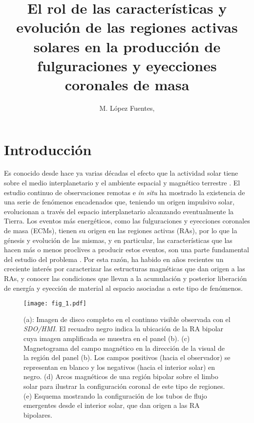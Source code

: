 \documentclass[baaa]{baaa}
\title{El rol de las características y evolución de las regiones
activas solares en la producción de fulguraciones y
eyecciones coronales de masa}
\author{
M. López Fuentes\inst{1},
}
\institute{
Instituto de Astronomía y Física del Espacio, CONICET--UBA, Argentina
}
\begin{document}
\maketitle

\section{Introducción}
\label{S_intro}

Es conocido desde hace ya varias décadas el efecto que la actividad solar tiene sobre el medio interplanetario y el ambiente espacial y magnético terrestre \citep{temmer2021}. El estudio continuo de observaciones remotas e \textit{in situ} ha mostrado la existencia de una serie de fenómenos encadenados que, teniendo un origen impulsivo solar, evolucionan a través del espacio interplanetario alcanzando eventualmente la Tierra. Los eventos más energéticos, como las fulguraciones y eyecciones coronales de masa (ECMs), tienen su origen en las regiones activas (RAs), por lo que la génesis y evolución de las mismas, y en particular, las características que las hacen más o menos proclives a producir estos eventos, son una parte fundamental del estudio del problema \citep{toriumi2019}. Por esta razón, ha habido en años recientes un creciente interés por caracterizar las estructuras magnéticas que dan origen a las RAs, y conocer las condiciones que llevan a la acumulación y posterior liberación de energía y eyección de material al espacio asociadas a este tipo de fenómenos.

\begin{figure*}[!t]
\centering
\texttt{[image: fig\_1.pdf]}
\caption{(a): Imagen de disco completo en el continuo visible observada con el {\sl SDO/HMI}. El recuadro negro indica la ubicación de la RA bipolar cuya imagen amplificada se muestra en el panel (b). (c) Magnetograma del campo magnético en la dirección de la visual de la región del panel (b). Los campos positivos (hacia el observador) se representan en blanco y los negativos (hacia el interior solar) en negro. (d) Arcos magnéticos de una región bipolar sobre el limbo solar para ilustrar la configuración coronal de este tipo de regiones. (e) Esquema mostrando la configuración de los tubos de flujo emergentes desde el interior solar, que dan origen a las RA bipolares.}  
\label{fig_1}
\end{figure*}
\end{document}
